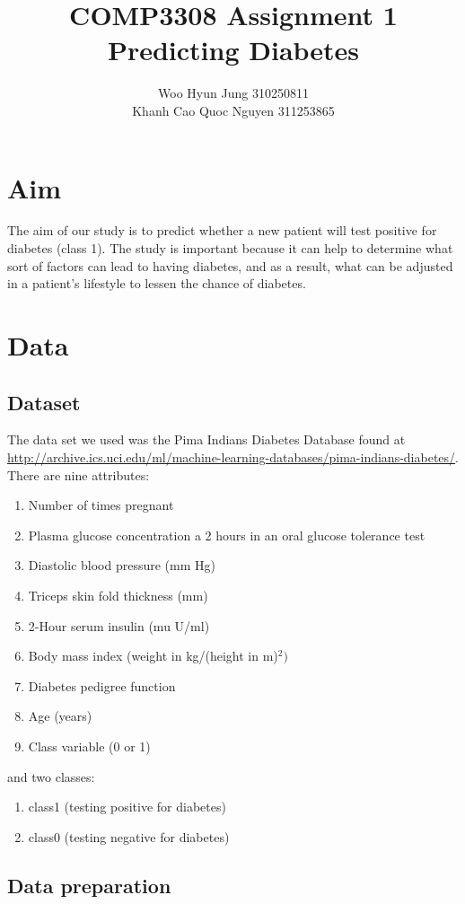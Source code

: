\documentclass{article}
\title{COMP3308 Assignment 1 \\ Predicting Diabetes}
\author{Woo Hyun Jung 310250811 \\  Khanh Cao Quoc Nguyen 311253865}
\date{}
\begin{document}
\maketitle
\thispagestyle{empty}
\newpage

\section{Aim}
The aim of our study is to predict whether a new patient will test positive for diabetes (class 1). The study is important because it can help to determine what sort of factors can lead to having diabetes, and as a result, what can be adjusted in a patient's lifestyle to lessen the chance of diabetes.

\section{Data}
\subsection{Dataset}
The data set we used was the Pima Indians Diabetes Database found at \url{http://archive.ics.uci.edu/ml/machine-learning-databases/pima-indians-diabetes/}. \\
There are nine attributes: 
\begin{enumerate}[1.]
\item Number of times pregnant
\item Plasma glucose concentration a 2 hours in an oral glucose tolerance test
\item Diastolic blood pressure (mm Hg)
\item Triceps skin fold thickness (mm)
\item 2-Hour serum insulin (mu U/ml)
\item Body mass index (weight in kg/(height in m)$^2)$
\item Diabetes pedigree function
\item Age (years)
\item Class variable (0 or 1)
\end{enumerate} 
and two classes:
\begin{enumerate}[1.]
\item class1 (testing positive for diabetes)
\item class0 (testing negative for diabetes)
\end{enumerate} 

\subsection{Data preparation}
\end{document}
